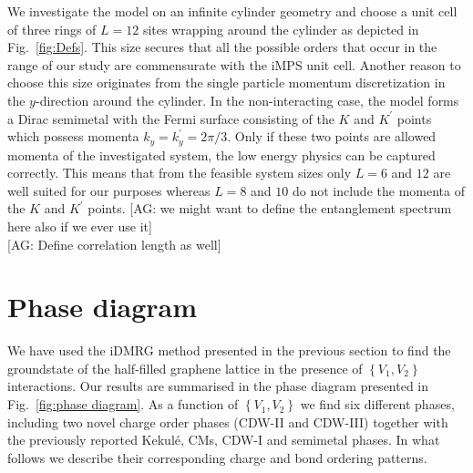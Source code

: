 \documentclass[aps,prx,10pt,twocolumn,floatfix,superscriptaddress,showpacs,numerical,footinbib]{revtex4-1}
\newcommand{\noteAG}[1]{{\color{blue} [AG: #1]}}
\begin{document}
We investigate the model on an infinite cylinder geometry and choose a unit cell of three rings of $L=12$ sites wrapping around the cylinder as depicted in Fig.~\ref{fig:Defs}. 
%
This size secures that all the possible orders that occur in the range of our study are commensurate with the iMPS unit cell. 
%
Another reason to choose this size originates from the single particle momentum discretization in the $y$-direction around the cylinder. 
%
In the non-interacting case, the model forms a Dirac semimetal with the Fermi surface consisting of the $K$ and $K^{\prime}$ points which possess momenta $k_y=k_y^{\prime} = 2\pi / 3$. 
%
Only if these two points are allowed momenta of the investigated system, the low energy physics can be captured correctly. 
%
This means that from the feasible system sizes only $L=6$ and $12$ are well suited for our purposes whereas $L=8$ and $10$ do not include the momenta of the $K$ and $K^{\prime}$ points.
%
\noteAG{we might want to define the entanglement spectrum here also if we ever use it}\\
\noteAG{Define correlation length as well}
%

\section{\label{sec:phasediagram}Phase diagram}
%
We have used the iDMRG method presented in the previous section
to find the groundstate of the half-filled graphene lattice in the presence of 
$\left\lbrace V_{1},V_{2}\right\rbrace$ interactions.
%
Our results are summarised in the phase diagram presented in Fig.~\ref{fig:phase diagram}.
%
As a function of $\left\lbrace V_{1},V_{2}\right\rbrace$ we find six different phases, 
including two novel charge order phases (CDW-II and CDW-III) together with the previously 
reported Kekul\'{e}, CMs, CDW-I and semimetal phases.
%
In what follows we describe their corresponding charge and bond ordering patterns.
%
\end{document}
